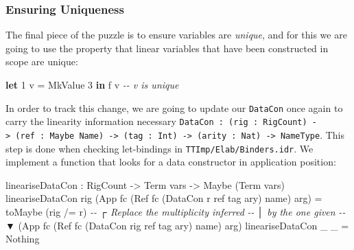 \documentclass[
]{article}
\newenvironment{Shaded}{}{}
\newcommand{\CommentTok}[1]{\textcolor[rgb]{0.38,0.63,0.69}{\textit{#1}}}
\newcommand{\DataTypeTok}[1]{\textcolor[rgb]{0.56,0.13,0.00}{#1}}
\newcommand{\DecValTok}[1]{\textcolor[rgb]{0.25,0.63,0.44}{#1}}
\newcommand{\KeywordTok}[1]{\textcolor[rgb]{0.00,0.44,0.13}{\textbf{#1}}}
\newcommand{\NormalTok}[1]{#1}
\newcommand{\OperatorTok}[1]{\textcolor[rgb]{0.40,0.40,0.40}{#1}}
\newcommand{\OtherTok}[1]{\textcolor[rgb]{0.00,0.44,0.13}{#1}}
\begin{document}
\hypertarget{ensuring-uniqueness}{%
\subsubsection{Ensuring Uniqueness}\label{ensuring-uniqueness}}

The final piece of the puzzle is to ensure variables are \emph{unique},
and for this we are going to use the property that linear variables that
have been constructed in scope are unique:

\begin{Shaded}
\begin{Highlighting}[]
\KeywordTok{let} \DecValTok{1}\NormalTok{ v }\OtherTok{=} \DataTypeTok{MkValue} \DecValTok{3} \KeywordTok{in}
\NormalTok{    f v }\CommentTok{{-}{-} v is unique}
\end{Highlighting}
\end{Shaded}

In order to track this change, we are going to update our
\texttt{DataCon} once again to carry the linearity information necessary
\texttt{DataCon\ :\ (rig\ :\ RigCount)\ -\textgreater{}\ (ref\ :\ Maybe\ Name)\ -\textgreater{}\ (tag\ :\ Int)\ -\textgreater{}\ (arity\ :\ Nat)\ -\textgreater{}\ NameType}.
This step is done when checking let-bindings in
\texttt{TTImp/Elab/Binders.idr}. We implement a function that looks for
a data constructor in application position:

\begin{Shaded}
\begin{Highlighting}[]
\NormalTok{lineariseDataCon }\OperatorTok{:} \DataTypeTok{RigCount} \OtherTok{{-}\textgreater{}} \DataTypeTok{Term}\NormalTok{ vars }
                \OtherTok{{-}\textgreater{}} \DataTypeTok{Maybe}\NormalTok{ (}\DataTypeTok{Term}\NormalTok{ vars)}
\NormalTok{lineariseDataCon rig }
\NormalTok{  (}\DataTypeTok{App}\NormalTok{ fc (}\DataTypeTok{Ref}\NormalTok{ fc\textquotesingle{} (}\DataTypeTok{DataCon}\NormalTok{ r ref tag ary) name) arg) }\OtherTok{=}
\NormalTok{    toMaybe }
\NormalTok{      (rig }\OperatorTok{/=}\NormalTok{ r) }\CommentTok{{-}{-}              ┌ Replace the multiplicity inferred}
                 \CommentTok{{-}{-}              │ by the one given}
                 \CommentTok{{-}{-}              ▼}
\NormalTok{      (}\DataTypeTok{App}\NormalTok{ fc (}\DataTypeTok{Ref}\NormalTok{ fc\textquotesingle{} (}\DataTypeTok{DataCon}\NormalTok{ rig ref tag ary) name) arg)}
\NormalTok{lineariseDataCon \_ \_ }\OtherTok{=} \DataTypeTok{Nothing}
\end{Highlighting}
\end{Shaded}
\end{document}
